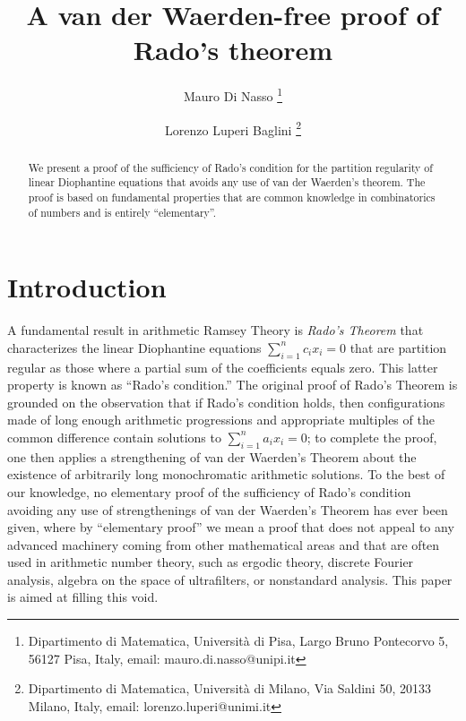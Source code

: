 \documentclass[a4paper,oneside]{article}
\theoremstyle{definition}
\theoremstyle{named}
\begin{document}
\title{A van der Waerden-free proof of Rado's theorem}
\maketitle
\author{Mauro Di Nasso  \thanks{Dipartimento di Matematica, Universit\`a di Pisa, Largo Bruno Pontecorvo 5, 56127 Pisa, Italy, email: mauro.di.nasso@unipi.it}}

\author{Lorenzo Luperi Baglini  \thanks{Dipartimento di Matematica, Università  di Milano, Via Saldini 50, 20133 Milano, Italy, email: lorenzo.luperi@unimi.it}}






\begin{abstract} 
We present a proof of the sufficiency of Rado's condition 
for the partition regularity of linear Diophantine equations that avoids 
any use of van der Waerden's theorem.
The proof is based on fundamental properties that are common knowledge 
in combinatorics of numbers and is entirely ``elementary''.
\end{abstract}






\section*{Introduction}

A fundamental result in arithmetic Ramsey Theory is \emph{Rado's Theorem}
that characterizes the linear Diophantine equations $\sum_{i=1}^nc_i x_i=0$
that are partition regular as those where
a partial sum of the coefficients equals zero. 
This latter property is known as ``Rado's condition.''
The original proof of Rado's Theorem is grounded on the observation that 
if Rado's condition holds, then configurations made of long enough arithmetic progressions and appropriate multiples of the common difference contain solutions 
to $\sum_{i=1}^{n}a_{i}x_{i}=0$; to complete the proof,
one then applies a strengthening of van der Waerden's Theorem about the existence of arbitrarily long 
monochromatic arithmetic solutions. 
To the best of our knowledge, no elementary proof of the sufficiency of 
Rado's condition avoiding any use of strengthenings of van der Waerden's Theorem has ever been given, 
where by ``elementary proof'' we mean a proof that does 
not appeal to any advanced machinery coming from other mathematical areas 
and that are often used in arithmetic number theory, 
such as ergodic theory, discrete Fourier analysis, algebra on the space
of ultrafilters, or nonstandard analysis.
This paper is aimed at filling this void. 
\end{document}
